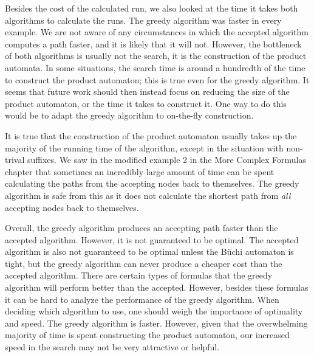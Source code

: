 Besides the cost of the calculated run, we also looked at the time it takes both algorithms to calculate the runs. The greedy algorithm was faster in every example. We are not aware of any circumstances in which the accepted algorithm computes a path faster, and it is likely that it will not. However, the bottleneck of both algorithms is usually not the search, it is the construction of the product automata. In some situations, the search time is around a hundredth of the time to construct the product automaton; this is true even for the greedy algorithm. It seems that future work should then instead focus on reducing the size of the product automaton, or the time it takes to construct it. One way to do this would be to adapt the greedy algorithm to on-the-fly construction. 

It is true that the construction of the product automaton usually takes up the majority of the running time of the algorithm, except in the situation with non-trival suffixes. We saw in the modified example 2 in the More Complex Formulas chapter that sometimes an incredibly large amount of time can be spent calculating the paths from the accepting nodes back to themselves. The greedy algorithm is safe from this as it does not calculate the shortest path from \textit{all} accepting nodes back to themselves. 

Overall, the greedy algorithm produces an accepting path faster than the accepted algorithm. However, it is not guaranteed to be optimal. The accepted algorithm is also not guaranteed to be optimal unless the B\"uchi automaton is tight, but the greedy algorithm can never produce a cheaper cost than the accepted algorithm. There are certain types of formulas that the greedy algorithm will perform better than the accepted. However, besides these formulas it can be hard to analyze the performance of the greedy algorithm. When deciding which algorithm to use, one should weigh the importance of optimality and speed. The greedy algorithm is faster. However, given that the overwhelming majority of time is spent constructing the product automaton, our increased speed in the search may not be very attractive or helpful.  